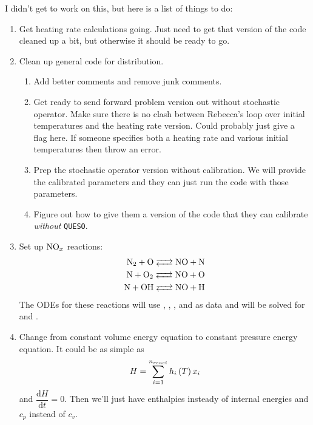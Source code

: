 I didn't get to work on this, but here is a list of things to do:
\begin{enumerate}
  \item Get heating rate calculations going.  Just need to get that version of the code cleaned up a bit, but otherwise it should be ready to go.
  \item Clean up general code for distribution.
    \begin{enumerate}
      \item Add better comments and remove junk comments.
      \item Get ready to send forward problem version out without stochastic operator.  Make sure there is no clash between Rebecca's loop over initial temperatures and the heating rate version.  Could probably just give a flag here.  If someone specifies both a heating rate and various initial temperatures then throw an error.
      \item Prep the stochastic operator version without calibration.  We will provide the calibrated parameters and they can just run the code with those parameters.
      \item Figure out how to give them a version of the code that they can calibrate \textit{without} \texttt{QUESO}.
    \end{enumerate}
    \item Set up $\ce{NO_x}$ reactions:
      \begin{align*}
        \ce{N2 + O <--> NO + N} \\
        \ce{N + O2 <--> NO + O} \\
        \ce{N + OH <--> NO + H}
      \end{align*}
      The ODEs for these reactions will use , , , and  as data and will be solved for  and .
    \item Change from constant volume energy equation to constant pressure energy equation.  It could be as simple as
      \begin{align*}
        H = \sum_{i=1}^{n_{react}}{h_{i}\left(T\right)x_{i}}
      \end{align*}
      and $\dfrac{\mathrm{d}H}{\mathrm{d}t} = 0$.  Then we'll just have enthalpies insteady of internal energies and $c_{p}$ instead of $c_{v}$.
\end{enumerate}



